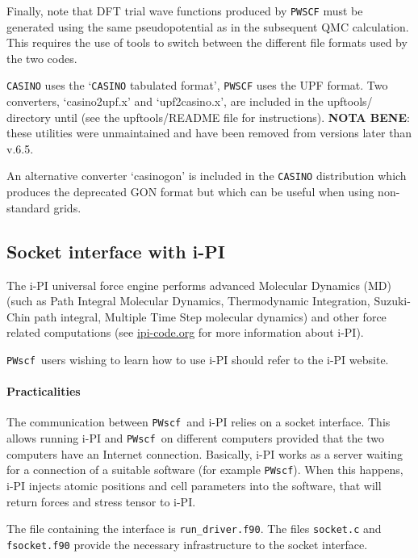 \documentclass[12pt,a4paper]{article}
\def\PWscf{\texttt{PWscf}}
\begin{document}
Finally, note that DFT trial wave functions produced by \texttt{PWSCF}
must be generated using the same pseudopotential as in the subsequent QMC 
calculation. This requires the use of tools to switch between the different 
file formats used by the two codes.

\texttt{CASINO} uses the `\texttt{CASINO} tabulated format', \texttt{PWSCF} 
uses the UPF format. Two converters, `casino2upf.x' and `upf2casino.x',
are included in the upftools/ directory until (see the upftools/README 
file for instructions). {\bf NOTA BENE}: these utilities were unmaintained 
and have been removed from versions later than v.6.5.

An alternative converter `casinogon' is included in the \texttt{CASINO} distribution which produces the deprecated GON format but which can be useful when using non-standard grids.

\subsection{Socket interface with i-PI}

The i-PI universal force engine performs advanced Molecular Dynamics
(MD) (such as Path Integral Molecular Dynamics, Thermodynamic
Integration, Suzuki-Chin path integral, Multiple Time Step molecular
dynamics) and other force related computations (see \url{ipi-code.org}
for more information about i-PI).  

\PWscf\ users wishing to learn how to use i-PI should refer to the i-PI website.

\paragraph{Practicalities}
The communication between \PWscf\ and i-PI relies on a socket
interface. This allows running i-PI and \PWscf\ on different computers
provided that the two computers have an Internet
connection. Basically, i-PI works as a server waiting for a connection
of a suitable software (for example \PWscf). When this happens, i-PI
injects atomic positions and cell parameters into the software, that
will return forces and stress tensor to i-PI.  

The file containing the interface is \verb#run_driver.f90#. The files
\verb#socket.c# and \verb#fsocket.f90# provide the necessary
infrastructure to the socket interface.  
\end{document}
